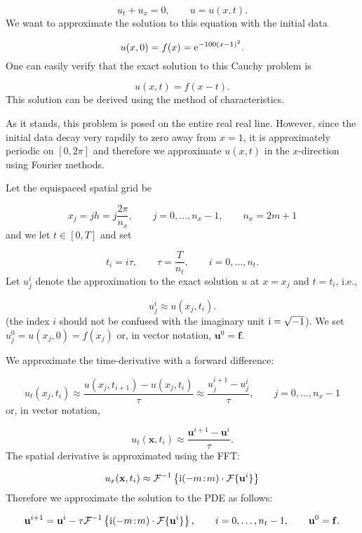 \documentclass[12pt,landscape]{article}
\begin{document}
{\[
u_t + u_x = 0, \qquad u = u(x,t).
\]
We want to approximate the solution to this equation with the initial data

\[
u(x,0) = f(x) = {\rm e}^{-100(x-1)^2}.
\]
One can easily verify that the exact solution to this Cauchy problem is

\[
u(x,t) = f(x - t).
\]
This solution can be derived using the method of characteristics.     

As it stands, this problem is posed on the entire real real line.  However, since the initial data decay very rapdily to zero away from $x=1$, it is approximately periodic on $[0, 2\pi]$ and therefore we approximate $u(x,t)$ in the $x$-direction using Fourier methods. 

Let the equispaced spatial grid be

\[
x_j = jh = j \frac{2\pi}{n_x}, \qquad j = 0, \ldots, n_x-1, \qquad n_x = 2m+1
\]
and we let $t \in [0, T]$ and set

\[
t_i = i\tau, \qquad \tau = \frac{T}{n_t}, \qquad i = 0, \ldots, n_t.
\]
Let $u^{i}_j$ denote the approximation to the exact solution $u$ at $x=x_j$ and $t = t_i$, i.e.,

\[
u^{i}_j \approx u(x_j, t_i).
\]
(the index $i$ should not be confused with the imaginary unit ${\rm i} = \sqrt{-1}$).  We set $u^{0}_j = u(x_j,0) = f(x_j)$ or, in vector notation, $\mathbf{u}^{0} = \mathbf{f}$.

We approximate the time-derivative with a forward difference:

\[
u_t(x_j,t_i) \approx \frac{u(x_j,t_{i+1}) - u(x_j,t_{i})}{\tau} \approx \frac{u^{i+1}_j - u^{i}_j}{\tau}, \qquad j = 0, \ldots, n_x-1
\]
or, in vector notation,

\[
u_t(\mathbf{x},t_i) \approx \frac{\mathbf{u}^{i+1} - \mathbf{u}^{i}}{\tau}.
\]
The spatial derivative is approximated using the FFT:

\[
u_x(\mathbf{x},t_i) \approx \mathcal{F}^{-1}\left\lbrace {\rm i}(-m\!:\!m)\cdot\mathcal{F}\lbrace \mathbf{u}^{i} \rbrace\right\rbrace
\]
Therefore we approximate the solution to the PDE as follows:

\[
\mathbf{u}^{i+1} = \mathbf{u}^{i} - \tau \mathcal{F}^{-1}\left\lbrace {\rm i}(-m\!:\!m)\cdot\mathcal{F}\lbrace \mathbf{u}^{i} \rbrace\right\rbrace, \qquad i = 0, \ldots, n_t-1, \qquad \mathbf{u}^0 = \mathbf{f}.
\]

}
\end{document}
